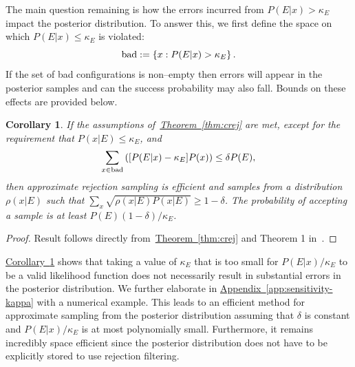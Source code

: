 \documentclass{article} %
\newtheorem{corollary}{Corollary}
\newcommand{\app}[1]{\hyperref[app:#1]{Appendix~\ref*{app:#1}}}
\newcommand{\thm}[1]{\hyperref[thm:#1]{Theorem~\ref*{thm:#1}}}
\newcommand{\cor}[1]{\hyperref[cor:#1]{Corollary~\ref*{cor:#1}}}
\begin{document}
The main question remaining is how  the
errors incurred from $P(E|x) > \kappa_E$ impact the posterior distribution.
To answer this, we first define the space on which $P(E|x)\le \kappa_E$ is violated:
\begin{equation}
{\rm bad} := \left\{x: {P(E|x)} >{\kappa_E}\right\}.
\end{equation}
If the set of bad configurations is non--empty then errors will appear in the posterior samples and
can the success probability may also fall.  Bounds on these effects are
provided below.

\begin{corollary}\label{cor:badalgorithm}
If the assumptions of~\thm{crej} are met, except for the requirement that $P(x|E) \le \kappa_E$, and
$$\sum_{x\in {\rm bad}}  \left([P(E|x)-\kappa_E] P(x)\right) \le \delta P(E),$$
  then approximate rejection sampling is  efficient and samples from a distribution $\rho(x|E)$ such that ${\sum_x \sqrt{\rho(x|E) P(x|E)}} \ge 1-\delta$.
The probability of accepting a sample is at least ${P(E) (1-\delta)}/{\kappa_E}$.\label{thm:kappa}
\end{corollary}
\begin{proof}
Result follows directly from~\thm{crej} and Theorem 1 in~\cite{WKGS15}.
\end{proof}

\cor{badalgorithm} shows that taking a value of $\kappa_E$ that is too small for $P(E|x)/\kappa_E$ to be a valid likelihood function does not necessarily result in substantial errors in the posterior distribution.
We further elaborate in \app{sensitivity-kappa} with a numerical example.
This leads to an efficient method for approximate sampling from the posterior distribution assuming that $\delta$ is constant and $P(E|x)/\kappa_E$ is at most polynomially small.  Furthermore, it remains incredibly space efficient since the posterior distribution does not have to be explicitly stored to use rejection filtering.
\end{document}
